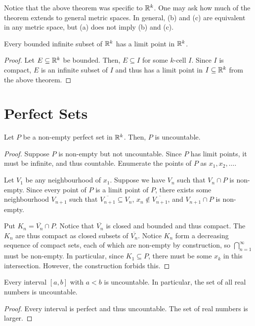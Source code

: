 \begin{remark}
Notice that the above theorem was specific to $\mathbb{R}^k$. One may ask how much of the theorem extends to general metric spaces. In general, (b) and (c) are equivalent in any metric space, but (a) does not imply (b) and (c).
\end{remark}

\begin{theorem}[(Weierstrass)]
Every bounded infinite subset of $\mathbb{R}^k$ has a limit point in $\mathbb{R}^k$. 

\begin{proof}
Let $E \subseteq \mathbb{R}^k$ be bounded. Then, $E \subseteq I$ for some $k$-cell $I$. Since $I$ is compact, $E$ is an infinite subset of $I$ and thus has a limit point in $I \subseteq \mathbb{R}^k$ from the above theorem.
\end{proof}
\end{theorem}

\section{Perfect Sets}

\begin{theorem}
Let $P$ be a non-empty perfect set in $\mathbb{R}^k$. Then, $P$ is uncountable. 

\begin{proof}
Suppose $P$ is non-empty but not uncountable. Since $P$ has limit points, it must be infinite, and thus countable. Enumerate the points of $P$ as $x_1, x_2, \dotsc$. 

Let $V_1$ be any neighbourhood of $x_1$. Suppose we have $V_n$ such that $V_n \cap P$ is non-empty. Since every point of $P$ is a limit point of $P$, there exists some neighbourhood $V_{n+1}$ such that $\overline{V_{n+1}} \subseteq V_n$, $x_n \not\in \overline{V_{n+1}}$, and $V_{n+1} \cap P$ is non-empty. 

Put $K_n = \overline{V_n} \cap P$. Notice that $\overline{V_n}$ is closed and bounded and thus compact. The $K_n$ are thus compact as closed subsets of $\overline{V_n}$. Notice $K_n$ form a decreasing sequence of compact sets, each of which are non-empty by construction, so $\bigcap_{n=1}^{\infty}$ must be non-empty. In particular, since $K_1 \subseteq P$, there must be some $x_k$ in this intersection. However, the construction forbids this.
\end{proof}
\end{theorem}

\begin{corollary}
Every interval $[a, b]$ with $a < b$ is uncountable. In particular, the set of all real numbers is uncountable.

\begin{proof}
Every interval is perfect and thus uncountable. The set of real numbers is larger.
\end{proof}
\end{corollary}


